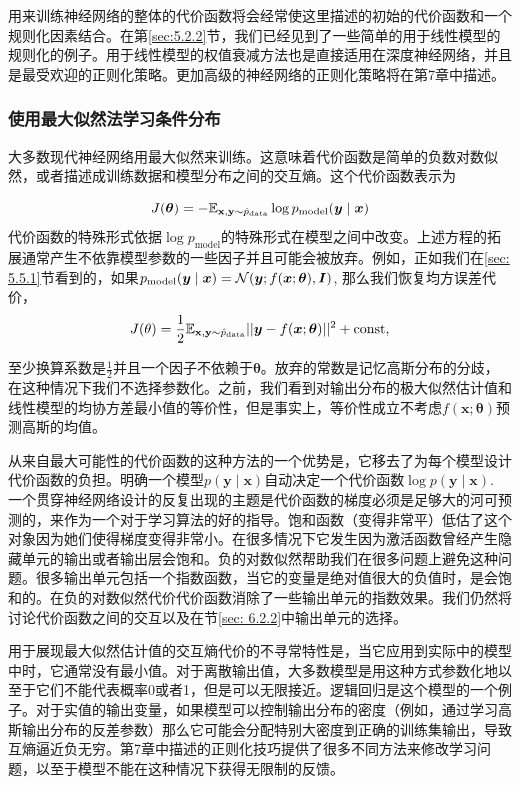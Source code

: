 用来训练神经网络的整体的代价函数将会经常使这里描述的初始的代价函数和一个规则化因素结合。在第\ref{sec:5.2.2}节，我们已经见到了一些简单的用于线性模型的规则化的例子。用于线性模型的权值衰减方法也是直接适用在深度神经网络，并且是最受欢迎的正则化策略。更加高级的神经网络的正则化策略将在第7章中描述。

\subsubsection{使用最大似然法学习条件分布}
\label{sec:6.2.1.1}

大多数现代神经网络用最大似然来训练。这意味着代价函数是简单的负数对数似然，或者描述成训练数据和模型分布之间的交互熵。这个代价函数表示为

\begin{equation}
J(\bm{\theta})=-\mathbb{E}_{\mathbf{x}, \mathbf{y} \sim \hat{p}_\text{data}} \log p_\text{model} (\bm{y} \mid \bm{x})
\end{equation} 
代价函数的特殊形式依据$\log p_\text{model}$的特殊形式在模型之间中改变。上述方程的拓展通常产生不依靠模型参数的一些因子并且可能会被放弃。例如，正如我们在\ref{sec: 5.5.1}节看到的，如果$p_\text{model}(\bm{y}\mid\bm{x}) = \mathcal{N}(\bm{y};f(\bm{x};\bm{\theta}), \bm{I})$, 那么我们恢复均方误差代价，
\begin{equation}
J(\theta) = \frac{1}{2} \mathbb{E}_{\mathbf{x}, \mathbf{y} \sim  \hat{p}_\text{data}} || \bm{y} - f(\bm{x}; \bm{\theta}) ||^2 + \text{const},
\end{equation}

至少换算系数是$\frac{1}{2}$并且一个因子不依赖于$\bm{\theta}$。放弃的常数是记忆高斯分布的分歧，在这种情况下我们不选择参数化。之前，我们看到对输出分布的极大似然估计值和线性模型的均协方差最小值的等价性，但是事实上，等价性成立不考虑$f(\bm{x};\bm{\theta})$预测高斯的均值。

从来自最大可能性的代价函数的这种方法的一个优势是，它移去了为每个模型设计代价函数的负担。明确一个模型$p(\bm{y}\mid\bm{x})$自动决定一个代价函数$\log p(\bm{y}\mid\bm{x})$.
一个贯穿神经网络设计的反复出现的主题是代价函数的梯度必须是足够大的河可预测的，来作为一个对于学习算法的好的指导。饱和函数（变得非常平）低估了这个对象因为她们使得梯度变得非常小。在很多情况下它发生因为激活函数曾经产生隐藏单元的输出或者输出层会饱和。负的对数似然帮助我们在很多问题上避免这种问题。很多输出单元包括一个指数函数，当它的变量是绝对值很大的负值时，是会饱和的。在负的对数似然代价代价函数消除了一些输出单元的指数效果。我们仍然将讨论代价函数之间的交互以及在节\ref{sec: 6.2.2}中输出单元的选择。

用于展现最大似然估计值的交互熵代价的不寻常特性是，当它应用到实际中的模型中时，它通常没有最小值。对于离散输出值，大多数模型是用这种方式参数化地以至于它们不能代表概率0或者1，但是可以无限接近。逻辑回归是这个模型的一个例子。对于实值的输出变量，如果模型可以控制输出分布的密度（例如，通过学习高斯输出分布的反差参数）那么它可能会分配特别大密度到正确的训练集输出，导致互熵逼近负无穷。第7章中描述的正则化技巧提供了很多不同方法来修改学习问题，以至于模型不能在这种情况下获得无限制的反馈。


